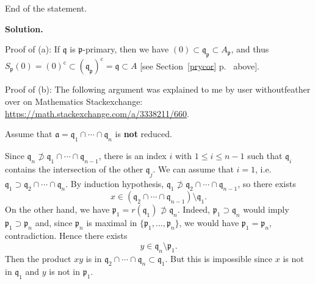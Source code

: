 \documentclass[12pt,letterpaper]{article}%
\newcommand{\oo}{\operatorname}\newcommand{\ooo}{\operatorname*}
\newcommand{\mf}{\mathfrak}
\newcommand{\ppp}{\mf p}
\newcommand{\qqq}{\mf q}
\newcommand{\nn}{\noindent}
\begin{document}
\nn[Proof of (b) by induction on $n$. The case $n=1$ is trivial (take $\mathfrak a=\mathfrak p_1$). Suppose $n>1$ and let $\mathfrak p_n$ be maximal in the set $\{\mathfrak p_1,\dots,\mathfrak p_n\}$. By the inductive hypothesis there exists an ideal $\mathfrak b$ and a minimal primary decomposition $\mathfrak b=\mathfrak q_1\cap\dots\cap\mathfrak q_{n-1}$, where each $\mathfrak q_i$ is $\mathfrak p_i$-primary. If $\mathfrak b\subset S_{\mathfrak p_n}(0)$ let $\mathfrak p$ be a minimal prime ideal of $A$ contained in $\mathfrak p_n$. Then $S_{\mathfrak p_n}(0)\subset S_{\mathfrak p}(0)$, hence $\mathfrak b\subset S_{\mathfrak p}(0)$. Taking radicals and using Exercise~10, we have $\mathfrak p_1\cap\dots\cap\mathfrak p_{n-1}\subset\mathfrak p$, hence some $\mathfrak p_i\subset \mathfrak p$, hence $\mathfrak p_i=\mathfrak p$ since $\mathfrak p$ is minimal. This is a contradiction since no $\mathfrak p_i$ is minimal. Hence $\mathfrak b\not\subset S_{\mathfrak p_n}(0)$ and therefore\footnote{By the condition in the first sentence of (b).} there exists a $\mathfrak p_n$-primary ideal $\mathfrak q_n$ such that $\mathfrak b\not\subset\mathfrak q_n$. Show that $\mathfrak a=\mathfrak q_1\cap\dots\cap\mathfrak q_n$ has the required properties.]

\nn End of the statement.

\nn\textbf{Solution.}

\nn Proof of (a): If $\qqq$ is $\ppp$-primary, then we have $(0)\subset\qqq_\ppp\subset A_\ppp$, and thus $S_\ppp(0)=(0)^{\oo c}\subset(\qqq_\ppp)^{\oo c}=\qqq\subset A$ [see Section~\ref{prycor} p.~\pageref{prycor} above]. 

\nn Proof of (b): The following argument was explained to me by user withoutfeather over on Mathematics Stackexchange: \href{https://math.stackexchange.com/a/3338211/660}{https://math.stackexchange.com/a/3338211/660}. 

Assume that $\mathfrak{a}=\mathfrak{q}_1\cap\cdots\cap\mathfrak{q}_n$ is \textbf{not} reduced.

Since $\mathfrak{q}_n\not\supset\mathfrak{q}_1\cap\cdots\cap\mathfrak{q}_{n-1}$, there is an index $i$ with $1\leq i\leq n-1$ such that $\mathfrak{q}_i$ contains the intersection of the other $\qqq_j$. We can assume that $i=1$, i.e. $\mathfrak{q}_1\supset\mathfrak{q}_2\cap\cdots\cap\mathfrak{q}_n$. By induction hypothesis, $\mathfrak{q}_1\not\supset\mathfrak{q}_2\cap\cdots\cap\mathfrak{q}_{n-1}$, so there exists 
$$
x\in(\mathfrak{q}_2\cap\cdots\cap\mathfrak{q}_{n-1})\setminus\mathfrak{q}_1.
$$ 
On the other hand, we have $\mathfrak{p}_1=r(\mathfrak{q}_1)\not \supset \mathfrak{q}_n$. Indeed, $\mathfrak{p}_1\supset \mathfrak{q}_n$ would imply $\mathfrak{p}_1\supset \mathfrak{p}_n$ and, since $\mathfrak{p}_n$ is maximal in $\{\mathfrak{p}_1,\dots,\mathfrak{p}_n\}$, we would have $\mathfrak{p}_1=\mathfrak{p}_n$, contradiction. Hence there exists 
$$
y\in\mathfrak{q}_n\setminus\mathfrak{p}_1.
$$ 
Then the product $xy$ is in $\mathfrak{q}_2\cap\cdots\cap\mathfrak{q}_n\subset\mathfrak{q}_1$. But this is impossible since $x$ is not in $\qqq_1$ and $y$ is not in $\ppp_1$. 
\end{document}
